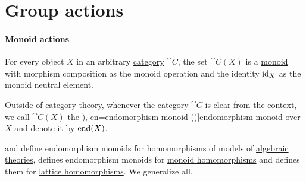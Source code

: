\section{Group actions}\label{sec:group_actions}

\paragraph{Monoid actions}

\begin{definition}\label{def:endomorphism_monoid}\mimprovised
  For every object \( X \) in an arbitrary \hyperref[def:category]{category} \( \cat{C} \), the set \( \cat{C}(X) \) is a \hyperref[def:monoid]{monoid} with morphism composition as the monoid operation and the identity \( \operatorname{id}_X \) as the monoid neutral element.

  Outside of \hyperref[ch:category_theory]{category theory}, whenever the category \( \cat{C} \) is clear from the context, we call \( \cat{C}(X) \) the \term[ru=полугруппа эндоморфизмов (\cite[127]{Курош1973ОбщаяАлгебра}), en=endomorphism monoid (\cite[60]{Jacobson1985BasicAlgebraI})]{endomorphism monoid} over \( X \) and denote it by \( \operatorname{end}(X) \).
\end{definition}
\begin{comments}
  \item {} and  define endomorphism monoids for homomorphisms of models of \hyperref[def:algebraic_theory]{algebraic theories},  defines endomorphism monoids for \hyperref[def:monoid/homomorphism]{monoid homomorphisms} and  defines them for \hyperref[def:lattice/homomorphism]{lattice homomorphisms}. We generalize all.
\end{comments}

